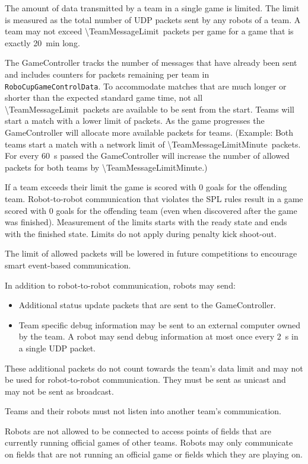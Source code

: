 The amount of data transmitted by a team in a single game is limited. The limit is measured as the total number of UDP packets sent by any robots of a team. A team may not exceed \qty{\TeamMessageLimit}{packets} per game for a game that is exactly \qty{20}{\minute} long.

The GameController tracks the number of messages that have already been sent and includes counters for packets remaining per team in \texttt{RoboCupGameControlData}. To accommodate matches that are much longer or shorter than the expected standard game time, not all \qty{\TeamMessageLimit}{packets} are available to be sent from the start. Teams will start a match with a lower limit of packets. As the game progresses the GameController will allocate more available packets for teams. (Example: Both teams start a match with a network limit of \qty{\TeamMessageLimitMinute}{packets}. For every \qty{60}{\second} passed the GameController will increase the number of allowed packets for both teams by \qty{\TeamMessageLimitMinute}{}.)

If a team exceeds their limit the game is scored with 0 goals for the offending team. Robot-to-robot communication that violates the SPL rules result in a game scored with 0 goals for the offending team (even when discovered after the game was finished). Measurement of the limits starts with the ready state and ends with the finished state. Limits do not apply during penalty kick shoot-out.

The limit of allowed packets will be lowered in future competitions to encourage smart event-based communication.

In addition to robot-to-robot communication, robots may send:
\begin{itemize}
 \item Additional status update packets that are sent to the GameController.
 \item Team specific debug information may be sent to an external computer owned by the team. A robot may send debug information at most once every \qty{2}{\second} in a single UDP packet.
\end{itemize}
These additional packets do not count towards the team's data limit and may not be used for robot-to-robot communication. They must be sent as unicast and may not be sent as broadcast.

Teams and their robots must not listen into another team's communication.

Robots are not allowed to be connected to access points of fields that are currently running official games of other teams.
Robots may only communicate on fields that are not running an official game or fields which they are playing on.

